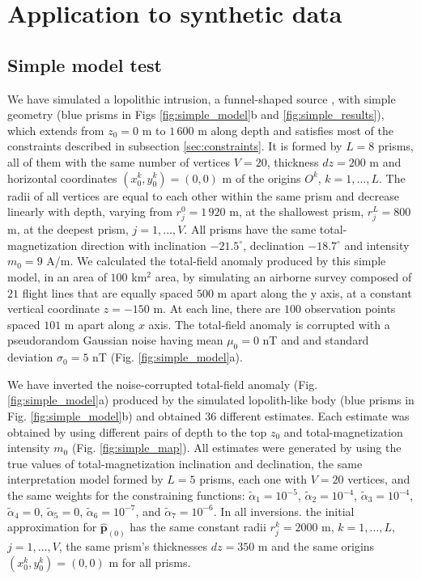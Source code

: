 \section{Application to synthetic data}\label{sec:synthetic}

\subsection{Simple model test}

We have simulated a lopolithic intrusion, a funnel-shaped source \cite[]{cawthorn-2018}, with simple geometry (blue prisms in Figs \ref{fig:simple_model}b and \ref{fig:simple_results}), which extends from $z_0=0$ m to $1\,600$ m along depth and satisfies most of the constraints described in subsection \ref{sec:constraints}. It is formed by $L=8$ prisms, all of them with the same number of vertices $ V = 20 $, thickness $ dz = 200 $ m and horizontal coordinates $ (x_0^k, y_0^k) = (0, 0) $ m of the origins $O^k$, $k=1,\dots,L$. The radii of all vertices are equal to each other within the same prism and decrease linearly with depth, varying from $r_j^0=1\,920$ m, at the shallowest prism, $r_j^L=800$ m, at the deepest prism, $j=1,\dots, V$. All prisms have the same total-magnetization direction with inclination $ -21.5^\circ $, declination $ -18.7^\circ $ and intensity $ m_0 = 9 $ A/m. We calculated the total-field anomaly produced by this simple model, in an area of $ 100 $ km$^2$ area, by simulating an airborne survey composed of $ 21 $ flight lines that are equally spaced $ 500 $ m apart along the y axis, at a constant vertical coordinate $ z = -150 $ m. At each line, there are $ 100 $ observation points spaced $101$ m apart along $ x $ axis. The total-field anomaly is corrupted with a pseudorandom Gaussian noise having mean $ \mu_0=0 $ nT and and standard deviation $ \sigma_0=5 $ nT (Fig. \ref{fig:simple_model}a).

We have inverted the noise-corrupted total-field anomaly (Fig. \ref{fig:simple_model}a) produced by the simulated lopolith-like body (blue prisms in Fig. \ref{fig:simple_model}b) and obtained 36 different estimates. Each estimate was obtained by using different pairs of depth to the top $ z_0 $ and total-magnetization intensity $ m_0 $ (Fig. \ref{fig:simple_map}). All estimates were generated by using the true values of total-magnetization inclination and declination, the same interpretation model formed by $ L = 5 $ prisms, each one with $ V = 20 $ vertices, and the same weights for the constraining functions: $\tilde{\alpha}_1 = 10^{-5}$, $\tilde{\alpha}_2 = 10^{-4}$, $\tilde{\alpha}_3 = 10^{-4}$, $\tilde{\alpha}_4 = 0$, $\tilde{\alpha}_5 = 0$, $\tilde{\alpha}_6 = 10^{-7}$, and $\tilde{\alpha}_7 = 10^{-6}$. In all inversions. the initial approximation for $\hat{\mathbf{p}}_{(0)}$ has the same constant radii $ r^k_j = 2000 $ m, $ k = 1, \dots, L $, $ j  = 1, \dots, V $, the same prism's thicknesses $ dz = 350 $ m and the same origins $(x^k_0, y^k_0) = (0, 0) $ m for all prisms.

